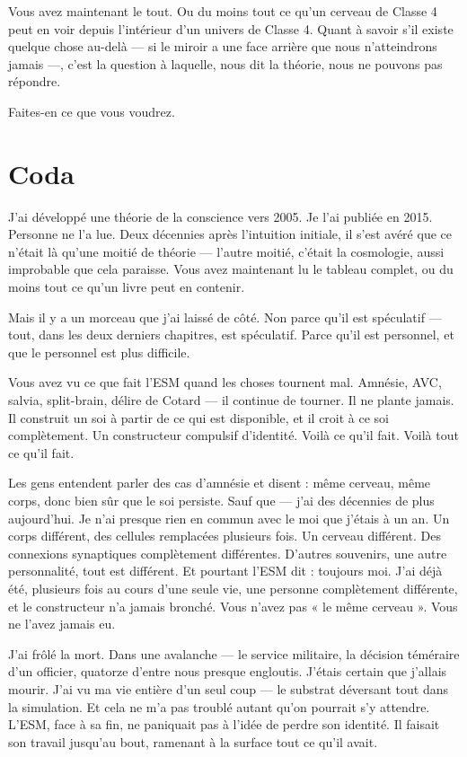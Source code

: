 \documentclass[11pt, twoside, openright]{book}
\begin{document}
Vous avez maintenant le tout. Ou du moins tout ce qu'un cerveau de Classe 4 peut en voir depuis l'intérieur d'un univers de Classe 4. Quant à savoir s'il existe quelque chose au-delà --- si le miroir a une face arrière que nous n'atteindrons jamais ---, c'est la question à laquelle, nous dit la théorie, nous ne pouvons pas répondre.

Faites-en ce que vous voudrez.


\chapter*{Coda}

J'ai développé une théorie de la conscience vers 2005. Je l'ai publiée en 2015. Personne ne l'a lue. Deux décennies après l'intuition initiale, il s'est avéré que ce n'était là qu'une moitié de théorie --- l'autre moitié, c'était la cosmologie, aussi improbable que cela paraisse. Vous avez maintenant lu le tableau complet, ou du moins tout ce qu'un livre peut en contenir.

Mais il y a un morceau que j'ai laissé de côté. Non parce qu'il est spéculatif --- tout, dans les deux derniers chapitres, est spéculatif. Parce qu'il est personnel, et que le personnel est plus difficile.

Vous avez vu ce que fait l'ESM quand les choses tournent mal. Amnésie, AVC, salvia, split-brain, délire de Cotard --- il continue de tourner. Il ne plante jamais. Il construit un soi à partir de ce qui est disponible, et il croit à ce soi complètement. Un constructeur compulsif d'identité. Voilà ce qu'il fait. Voilà tout ce qu'il fait.

Les gens entendent parler des cas d'amnésie et disent : même cerveau, même corps, donc bien sûr que le soi persiste. Sauf que --- j'ai des décennies de plus aujourd'hui. Je n'ai presque rien en commun avec le moi que j'étais à un an. Un corps différent, des cellules remplacées plusieurs fois. Un cerveau différent. Des connexions synaptiques complètement différentes. D'autres souvenirs, une autre personnalité, tout est différent. Et pourtant l'ESM dit : toujours moi. J'ai déjà été, plusieurs fois au cours d'une seule vie, une personne complètement différente, et le constructeur n'a jamais bronché. Vous n'avez pas « le même cerveau ». Vous ne l'avez jamais eu.

J'ai frôlé la mort. Dans une avalanche --- le service militaire, la décision téméraire d'un officier, quatorze d'entre nous presque engloutis. J'étais certain que j'allais mourir. J'ai vu ma vie entière d'un seul coup --- le substrat déversant tout dans la simulation. Et cela ne m'a pas troublé autant qu'on pourrait s'y attendre. L'ESM, face à sa fin, ne paniquait pas à l'idée de perdre son identité. Il faisait son travail jusqu'au bout, ramenant à la surface tout ce qu'il avait.
\end{document}
